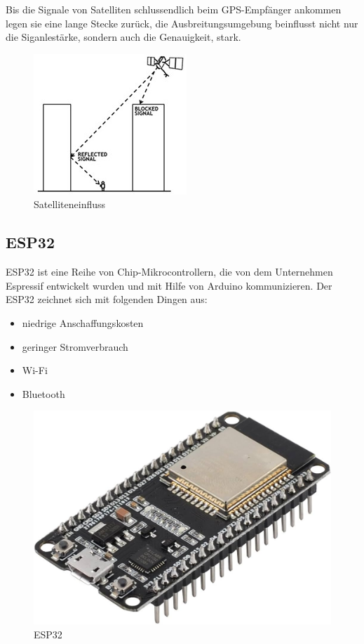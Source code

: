 Bis die Signale von Satelliten schlussendlich beim GPS-Empfänger ankommen legen sie eine lange Stecke zurück, die Ausbreitungsumgebung beinflusst nicht nur die Siganlestärke, sondern auch die Genauigkeit, stark. 
\begin{figure}[H]
	\centering
	\includegraphics[width=0.7\linewidth]{images/Satelliteneinfluss.jpg}
	\caption[Satelliteneinfluss]{Satelliteneinfluss}
	\label{fig:Satelliteneinfluss}
\end{figure}
\cite{GPS Fehlerquellen}

\subsection{ESP32}

ESP32 ist eine Reihe von Chip-Mikrocontrollern, die von dem Unternehmen Espressif entwickelt wurden und mit Hilfe von Arduino kommunizieren. Der ESP32 zeichnet sich mit folgenden Dingen aus:

\begin{itemize}
	\item niedrige Anschaffungskosten
	\item geringer Stromverbrauch
	\item Wi-Fi
	\item Bluetooth
\end{itemize}


\begin{figure}[H]
	\centering
	\includegraphics[width=0.7\linewidth]{images/ESP32.jpg}
	\caption[ESP32]{ESP32}
	\label{fig:ESP32}
\end{figure}

